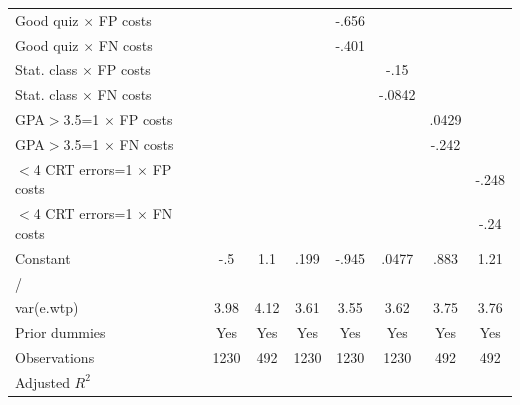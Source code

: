 {\begin{tabular}{l*{7}{c}}
Good quiz $\times$ FP costs&                  &                  &                  &    -.656\sym{***}&                  &                  &                  \\
Good quiz $\times$ FN costs&                  &                  &                  &    -.401\sym{***}&                  &                  &                  \\
Stat. class $\times$ FP costs&                  &                  &                  &                  &     -.15         &                  &                  \\
Stat. class $\times$ FN costs&                  &                  &                  &                  &   -.0842         &                  &                  \\
GPA$>$3.5=1 $\times$ FP costs&                  &                  &                  &                  &                  &    .0429         &                  \\
GPA$>$3.5=1 $\times$ FN costs&                  &                  &                  &                  &                  &    -.242         &                  \\
$<$4 CRT errors=1 $\times$ FP costs&                  &                  &                  &                  &                  &                  &    -.248         \\
$<$4 CRT errors=1 $\times$ FN costs&                  &                  &                  &                  &                  &                  &     -.24         \\
Constant        &      -.5         &      1.1         &     .199         &    -.945         &    .0477         &     .883         &     1.21         \\
\hline
/               &                  &                  &                  &                  &                  &                  &                  \\
var(e.wtp)      &     3.98\sym{***}&     4.12\sym{***}&     3.61\sym{***}&     3.55\sym{***}&     3.62\sym{***}&     3.75\sym{***}&     3.76\sym{***}\\
Prior dummies   &      Yes         &      Yes         &      Yes         &      Yes         &      Yes         &      Yes         &      Yes         \\
\hline
Observations    &     1230         &      492         &     1230         &     1230         &     1230         &      492         &      492         \\
Adjusted \(R^{2}\)&                  &                  &                  &                  &                  &                  &                  \\
\hline\hline
\end{tabular}
}

